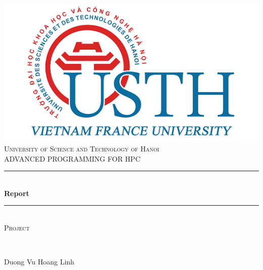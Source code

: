 \documentclass{article}
\title{}
\author{Linh Duong}
\date{December 2016}
\begin{document}
\begin{titlepage}
	\centering
    \includegraphics[scale = 0.75]{usthlogo}\\[1.0 cm]	%
    \textsc{\large University of Science and Technology of Hanoi}\\[1.5cm] %
    \textsc{\Large ADVANCED PROGRAMMING FOR HPC}\\[0.5cm] %
	\rule{\linewidth}{0.2 mm} \\[0.4 cm]
    { \huge \bfseries Report}\\[0.4cm] %
	\rule{\linewidth}{0.2 mm} \\[1.5 cm]
	\textsc{\Large Project}\\[1.5cm] 
	\begin{minipage}{0.6\textwidth}
		\begin{flushleft} \large
			\end{flushleft}
			\end{minipage}~
			\begin{minipage}{0.4\textwidth}
            
			\begin{flushright} \large
			\bigskip
			\bigskip
			\bigskip
			Duong Vu Hoang Linh\\
	    	\bigskip
		\end{flushright}
        
	\end{minipage}\\[2 cm]
	
	
\end{titlepage}
\end{document}
